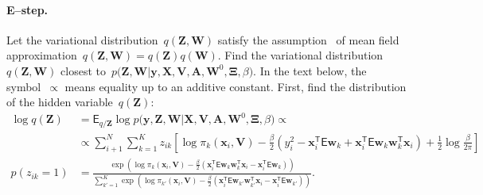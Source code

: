 \documentclass[12pt, twoside]{article}
\begin{document}
\paragraph{E--step.} 
Let the variational distribution~$q\left(\mathbf{Z}, \mathbf{W}\right)$ satisfy the assumption~\cite{bishop2006} of mean field approximation~$q\left(\mathbf{Z}, \mathbf{W}\right) = q\left(\mathbf{Z}\right)q\left(\mathbf{W}\right)$. Find the variational distribution~$q\left(\mathbf{Z}, \mathbf{W}\right)$ closest to~$p\bigr(\mathbf{Z}, \mathbf{W}|\mathbf{y}, \mathbf{X}, \mathbf{V}, \textbf{A}, \textbf{W}^{0}, \bm{\Xi}, \beta\bigr)$.
In the text below, the symbol~$\propto$ means equality up to an additive constant.
First, find the distribution of the hidden variable~$q\left(\textbf{Z}\right)$:
\[
\label{eq:em:4}
\begin{aligned}
\log q\left(\textbf{Z}\right) &= \mathsf{E}_{q/\textbf{Z}} \log p\bigr(\mathbf{y}, \mathbf{Z}, \mathbf{W}|\mathbf{X}, \mathbf{V}, \textbf{A}, \textbf{W}^{0}, \bm{\Xi}, \beta\bigr)  \propto\\
&\propto \sum_{i+1}^{N}\sum_{k=1}^{K}z_{ik}\left[\log\pi_{k}\left(\textbf{x}_{i}, \textbf{V}\right) - \frac{\beta}{2}\left(y_{i}^{2} -\textbf{x}_{i}^{\mathsf{T}}\mathsf{E}\textbf{w}_{k} + \textbf{x}_{i}^{\mathsf{T}}\mathsf{E}\textbf{w}_{k}\textbf{w}_{k}^{\mathsf{T}}\textbf{x}_{i}\right) + \frac{1}{2}\log\frac{\beta}{2\pi}\right]\\
p\left(z_{ik} = 1\right) &= \frac{\exp\left(\log\pi_{k}\left(\textbf{x}_{i}, \textbf{V}\right) - \frac{\beta}{2}\left(\textbf{x}_{i}^{\mathsf{T}}\mathsf{E}\textbf{w}_{k}\textbf{w}_{k}^{\mathsf{T}}\textbf{x}_{i} - \textbf{x}_{i}^{\mathsf{T}}\mathsf{E}\textbf{w}_{k}\right)\right)}{\sum_{k'=1}^{K}\exp\left(\log\pi_{k'}\left(\textbf{x}_{i}, \textbf{V}\right) - \frac{\beta}{2}\left(\textbf{x}_{i}^{\mathsf{T}}\mathsf{E}\textbf{w}_{k'}\textbf{w}_{k'}^{\mathsf{T}}\textbf{x}_{i} - \textbf{x}_{i}^{\mathsf{T}}\mathsf{E}\textbf{w}_{k'}\right) \right)}.
\end{aligned}
\]
\end{document}
